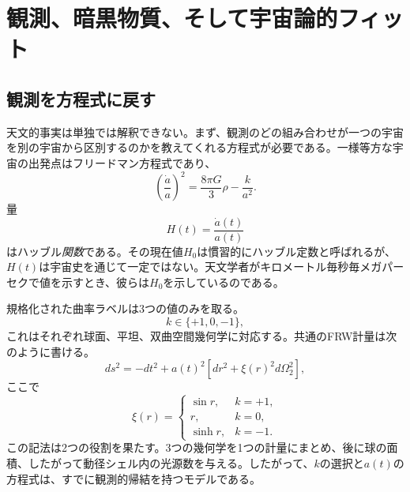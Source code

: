 \chapter{観測、暗黒物質、そして宇宙論的フィット}


\section{観測を方程式に戻す}

天文的事実は単独では解釈できない。まず、観測のどの組み合わせが一つの宇宙を別の宇宙から区別するのかを教えてくれる方程式が必要である。一様等方な宇宙の出発点はフリードマン方程式であり、
\begin{equation}
\left(\frac{\dot a}{a}\right)^2
=
\frac{8\pi G}{3}\rho-\frac{k}{a^2}.
\label{eq:c06-friedmann}
\end{equation}
量
\begin{equation}
H(t)=\frac{\dot a(t)}{a(t)}
\label{eq:c06-hubble}
\end{equation}
はハッブル\emph{関数}である。その現在値\(H_0\)は慣習的にハッブル定数と呼ばれるが、\(H(t)\)は宇宙史を通じて一定ではない。天文学者がキロメートル毎秒毎メガパーセクで値を示すとき、彼らは\(H_0\)を示しているのである。

規格化された曲率ラベルは3つの値のみを取る。
\begin{equation}
k\in\{+1,0,-1\},
\end{equation}
これはそれぞれ球面、平坦、双曲空間幾何学に対応する。共通のFRW計量は次のように書ける。
\begin{equation}
ds^2=-dt^2+a(t)^2\left[dr^2+\xi(r)^2d\Omega_2^2\right],
\label{eq:c06-frw}
\end{equation}
ここで
\begin{equation}
\xi(r)=
\begin{cases}
\sin r, & k=+1,\\
r, & k=0,\\
\sinh r, & k=-1.
\end{cases}
\label{eq:c06-xi}
\end{equation}
この記法は2つの役割を果たす。3つの幾何学を1つの計量にまとめ、後に球の面積、したがって動径シェル内の光源数を与える。したがって、\(k\)の選択と\(a(t)\)の方程式は、すでに観測的帰結を持つモデルである。

